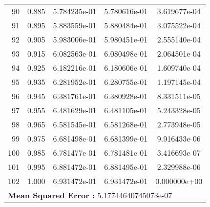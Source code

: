 \begin{table}[ht]
\begin{tabular}{rcccc}
    90 &  0.885 &    5.784235e-01 &    5.780616e-01  &     3.619677e-04\\ 
    91 &  0.895 &    5.883559e-01 &    5.880484e-01  &     3.075522e-04\\ 
    92 &  0.905 &    5.983006e-01 &    5.980451e-01  &     2.555140e-04\\ 
    93 &  0.915 &    6.082563e-01 &    6.080498e-01  &     2.064501e-04\\ 
    94 &  0.925 &    6.182216e-01 &    6.180606e-01  &     1.609740e-04\\ 
    95 &  0.935 &    6.281952e-01 &    6.280755e-01  &     1.197145e-04\\ 
    96 &  0.945 &    6.381761e-01 &    6.380928e-01  &     8.331511e-05\\ 
    97 &  0.955 &    6.481629e-01 &    6.481105e-01  &     5.243328e-05\\ 
    98 &  0.965 &    6.581545e-01 &    6.581268e-01  &     2.773948e-05\\ 
    99 &  0.975 &    6.681498e-01 &    6.681399e-01  &     9.916433e-06\\ 
    100 &  0.985 &    6.781477e-01 &    6.781481e-01  &     3.416693e-07\\ 
    101 &  0.995 &    6.881472e-01 &    6.881495e-01  &     2.329988e-06\\ 
    102 &  1.000 &    6.931472e-01 &    6.931472e-01  &     0.000000e+00\\ 
    \hline
     \multicolumn{5}{l}{\textbf{Mean Squared Error :} 5.17744640745073e-07}\\ 
  \end{tabular}
  \label{lbl:tabloExmp1_test}
\end{table}
